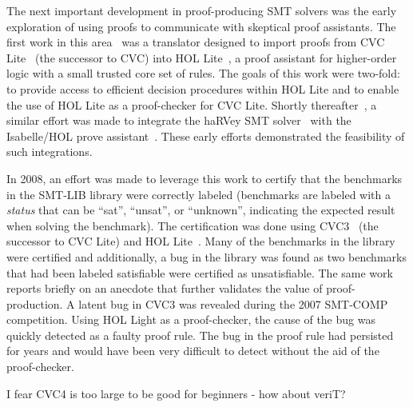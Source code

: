 \documentclass{llncs}
\begin{document}
The next important development in proof-producing SMT solvers was the
early exploration of using proofs to communicate with skeptical proof
assistants.  The first work in this area~\cite{MBG06} was a translator designed
to import proofs from CVC Lite~\cite{BB04} (the successor to CVC) into HOL
Lite~\cite{H96}, a proof assistant for higher-order logic with a small trusted
core set of rules.  The goals of this work were two-fold: to provide access to
efficient decision procedures within HOL Lite and to enable the use of HOL Lite
as a proof-checker for CVC Lite.  Shortly thereafter~\cite{FMM+06,HCF+07}, a similar effort was
made to integrate the haRVey SMT solver~\cite{DR03} with the Isabelle/HOL prove
assistant~\cite{NPW02}. These early efforts demonstrated the feasibility of such
integrations.

In 2008, an effort was made to leverage this work to certify that the
benchmarks in the SMT-LIB library were correctly labeled (benchmarks are
labeled with a \emph{status} that can be ``sat'', ``unsat'', or ``unknown'',
indicating the expected result when solving the benchmark).  The certification
was done using CVC3~\cite{BT07} (the successor to CVC Lite) and
HOL Lite~\cite{GB08}.  Many of the benchmarks in the library were certified and
additionally, a bug in the library was found as two benchmarks that had been
labeled satisfiable were certified as unsatisfiable.
The same work reports briefly on an anecdote that further validates the value
of proof-production.  A latent bug in CVC3 was revealed during the 2007
SMT-COMP competition.  Using HOL Light as a proof-checker, the cause of the bug
was quickly detected as a faulty proof rule.  The bug in the proof rule had
persisted for years and would have been very difficult to detect without the
aid of the proof-checker.






I fear CVC4 is too large to be good for beginners - how about veriT?
\end{document}
